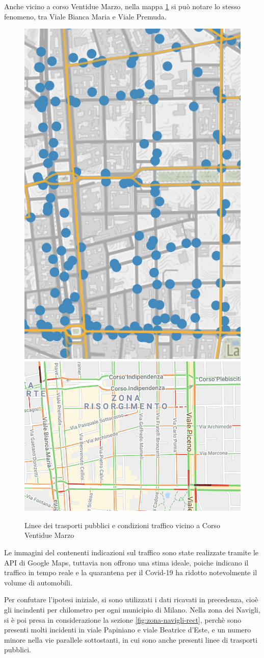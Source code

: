 \documentclass[a4paper,12pt]{report}
\begin{document}
Anche vicino a corso Ventidue Marzo, nella mappa \ref{fig:22-marzo} si può 
notare lo stesso fenomeno, tra Viale Bianca Maria e Viale Premuda.

\begin{figure}
    \includegraphics[width=0.25\linewidth]{../src/atm/22_marzo.png}
    \includegraphics[width=0.55\linewidth]{img/22_marzo.png}
    \caption{Linee dei trasporti pubblici e condizioni traffico vicino a Corso Ventidue Marzo}
    \label{fig:22-marzo}
\end{figure}

Le immagini del contenenti indicazioni sul traffico sono state realizzate tramite le API di 
Google Maps, tuttavia non offrono una stima ideale, poiche indicano il traffico in tempo reale e 
la quarantena per il Covid-19 ha ridotto notevolmente il volume di automobili.

Per confutare l'ipotesi iniziale, si sono utilizzati i dati ricavati in precedenza, 
cioè gli incindenti per chilometro per ogni municipio di Milano. 
Nella zona dei Navigli, si è poi presa in considerazione la sezione \ref{fig:zona-navigli-rect}, 
perchè sono presenti molti incidenti in viale Papiniano e viale Beatrice d'Este, 
e un numero minore nella vie parallele sottostanti, in cui sono anche presenti 
linee di trasporti pubblici.
\end{document}
